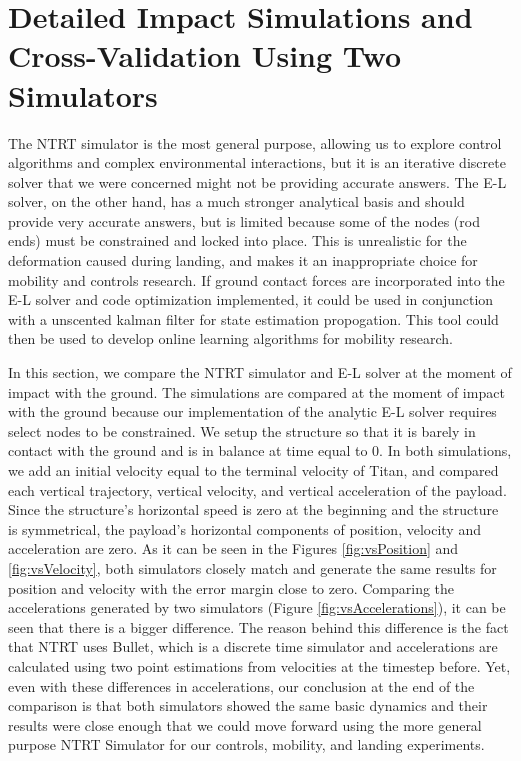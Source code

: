 \section{Detailed Impact Simulations and Cross-Validation Using Two Simulators}
The NTRT simulator is the most general purpose, allowing us to explore control algorithms and complex environmental interactions, but it is an iterative discrete solver that we were concerned might not be providing accurate answers.  The E-L solver, on the other hand, has a much stronger analytical basis and should provide very accurate answers, but is limited because some of the nodes (rod ends) must be constrained and locked into place.  This is unrealistic for the deformation caused during landing, and makes it an inappropriate choice for mobility and controls research.
If ground contact forces are incorporated into the E-L solver and code optimization implemented, it could be used in conjunction with a unscented kalman filter for state estimation propogation.
This tool could then be used to develop online learning algorithms for mobility research.

In this section, we compare the NTRT simulator and E-L solver at the moment of impact with the ground. 
The simulations are compared at the moment of impact with the ground because our implementation of the analytic E-L solver requires select nodes to be constrained.
We setup the structure so that it is barely in contact with the ground and is in balance at time equal to 0. 
In both simulations, we add an initial velocity equal to the terminal velocity of Titan, and compared each vertical trajectory, vertical velocity, and vertical acceleration of the payload. 
Since the structure's horizontal speed is zero at the beginning and the structure is symmetrical, the payload's horizontal components of position, velocity and acceleration are zero. 
As it can be seen in the Figures \ref{fig:vsPosition} and \ref{fig:vsVelocity}, both simulators closely match and generate the same results for position and velocity with the error margin close to zero. 
Comparing the accelerations generated by two simulators (Figure \ref{fig:vsAccelerations}), it can be seen that there is a bigger difference. 
The reason behind this difference is the fact that NTRT uses Bullet, which is a discrete time simulator and accelerations are calculated using two point estimations from velocities at the timestep before.  Yet, even with these differences in accelerations, our conclusion at the end of the comparison is that both simulators showed the same basic dynamics and their results were close enough that we could move forward using the more general purpose NTRT Simulator for our controls, mobility, and landing experiments.


